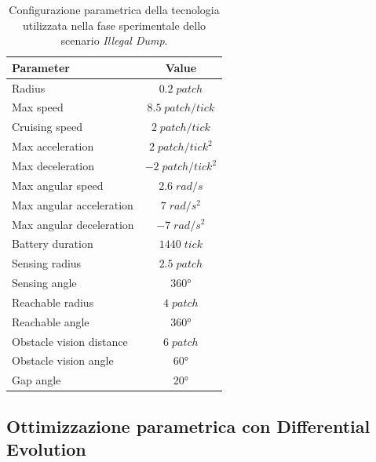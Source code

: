 \begin{table}[H]
    \centering
    
    \begin{tabular}{|l|c|}
    \hline
    \textbf{Parameter}              & \textbf{Value}                \\ \hline
    Radius                          & $0.2 \; patch$                \\ \hline
    Max speed                       & $8.5 \; patch/tick$           \\ \hline
    Cruising speed                  & $2 \; patch/tick$             \\ \hline
    Max acceleration                & $2 \; patch/tick^{2}$         \\ \hline
    Max deceleration                & $-2 \; patch/tick^{2}$        \\ \hline
    Max angular speed               & $2.6 \; rad/s$                \\ \hline
    Max angular acceleration        & $7 \; rad/s^{2}$              \\ \hline
    Max angular deceleration        & $-7 \; rad/s^{2}$             \\ \hline
    Battery duration                & $1440 \; tick$                \\ \hline
    Sensing radius                  & $2.5 \; patch$                \\ \hline
    Sensing angle                   & \ang{360}                        \\ \hline
    Reachable radius                & $4 \; patch$                  \\ \hline
    Reachable angle                 & \ang{360}                        \\ \hline
    Obstacle vision distance        & $6 \; patch$                  \\ \hline
    Obstacle vision angle           & \ang{60}                        \\ \hline
    Gap angle                       & \ang{20}                        \\ \hline
    \end{tabular}%
    
    \caption{Configurazione parametrica della tecnologia utilizzata nella fase sperimentale dello scenario \textit{Illegal Dump}.}
    \label{tabella_parametri_dump}
\end{table}

\subsection{Ottimizzazione parametrica con Differential Evolution}

